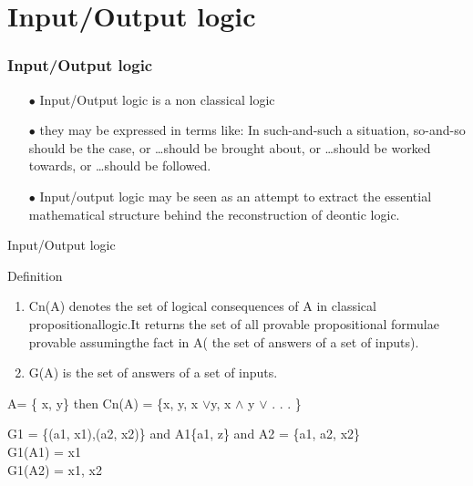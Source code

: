 \documentclass{beamer}
\begin{document}
\section{Input/Output logic}
\begin{frame}
\frametitle{Input/Output logic}
\begin{enumerate}
\item[$\bullet$]  Input/Output logic is a non classical logic
\item[$\bullet$]  they may be expressed in terms like: In such-and-such a situation, so-and-so should be the case, or …should be brought about, or …should be worked towards, or …should be followed.
\item[$\bullet$]Input/output logic may be seen as an attempt to extract the essential mathematical structure behind the reconstruction of deontic logic.
\end{enumerate}

\end{frame}
\begin{frame}{Input/Output logic}
\begin{block}{Definition}
\begin{enumerate}
    \item Cn(A)  denotes  the  set  of  logical  consequences  of  A  in  classical  propositionallogic.It returns the set of all provable propositional formulae provable assumingthe fact in A( the set of answers of a set of inputs).
    \item G(A) is the set of answers of a set of inputs.
\end{enumerate}
\end{block}
\begin{examples}
A= \{ x, y\} then Cn(A) = \{x, y, x $\vee $y, x $\wedge$ y $\vee$ . . . \}
\end{examples}
\begin{examples}
G1 = \{(a1, x1),(a2, x2)\} and A1\{a1, z\} and A2 = \{a1, a2, x2\}\\
G1(A1) = {x1}\\
G1(A2) = {x1, x2}
\end{examples}

    
\end{frame}
\end{document}
